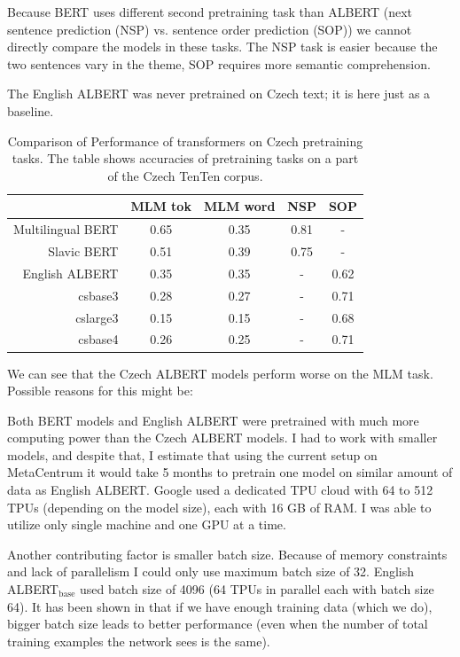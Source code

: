 \documentclass[
  printed, %
  color,   %
  table,   %
  oneside, %
  lof,     %
  lot,     %
]{fithesis3}
\begin{document}
Because BERT uses different second pretraining task than ALBERT (next sentence prediction (NSP) vs. sentence order prediction (SOP)) we cannot directly compare the models in these tasks. The NSP task is easier because the two sentences vary in the theme, SOP requires more semantic comprehension. 

The English ALBERT was never pretrained on Czech text; it is here just as a baseline.

\begin{table}[h]
\centering
\begin{tabular}{r|c|c|c|c}
                           & MLM tok & MLM word & NSP  & SOP  \\ 
    \toprule
    Multilingual BERT      & 0.65     & 0.35      & 0.81 & -    \\
    Slavic BERT            & 0.51     & 0.39      & 0.75 & -    \\ 
    English ALBERT         & 0.35     & 0.35      & -    & 0.62 \\ 
    csbase3                & 0.28     & 0.27      & -    & 0.71 \\ 
    cslarge3               & 0.15     & 0.15      & -    & 0.68 \\ 
    csbase4                & 0.26     & 0.25      & -    & 0.71 \\ 
\end{tabular}
\caption[Performance of transformers on Czech pretraining tasks]{Comparison of Performance of transformers on Czech pretraining tasks. The table shows accuracies of pretraining tasks on a part of the Czech TenTen corpus.}
\label{tab:pretr-compare}
\end{table} %

We can see that the Czech ALBERT models perform worse on the MLM task. Possible reasons for this might be:

Both BERT models and English ALBERT were pretrained with much more computing power than the Czech ALBERT models. I had to work with smaller models, and despite that, I estimate that using the current setup on MetaCentrum it would take 5 months to pretrain one model on similar amount of data as English ALBERT. Google used a dedicated TPU cloud with 64 to 512 TPUs (depending on the model size), each with 16 GB of RAM. I was able to utilize only single machine and one GPU at a time.

Another contributing factor is smaller batch size. Because of memory constraints and lack of parallelism I could only use maximum batch size of 32. English ALBERT$_{\text{base}}$ used batch size of 4096 (64 TPUs in parallel each with batch size 64). It has been shown in \parencite[page 27, Figure 11]{batch-size} that if we have enough training data (which we do), bigger batch size leads to better performance (even when the number of total training examples the network sees is the same).
\end{document}
